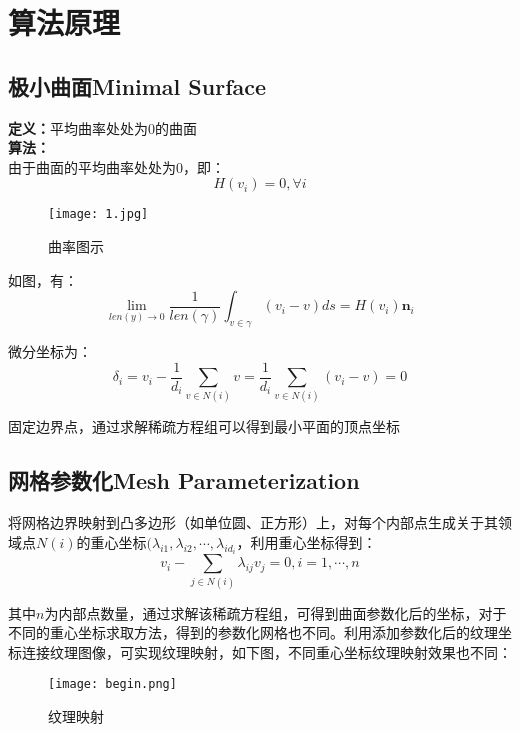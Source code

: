 \documentclass[14pt]{scrartcl} %
\begin{document}
\pagebreak
\section{算法原理}

\subsection{极小曲面Minimal Surface}

\textbf{定义：}平均曲率处处为0的曲面\\
\textbf{算法：}\\
由于曲面的平均曲率处处为0，即：
\begin{equation}
H(v_i)=0,\forall i
\end{equation}
\begin{figure}[h] %
	\centering
	\texttt{[image: 1.jpg]} %
	\caption{曲率图示}
\end{figure}

如图，有：
\begin{equation}
\lim\limits_{len(y)\rightarrow 0}\frac{1}{len(\gamma)}\int_{v\in \gamma}(v_i-v)ds=H(v_i)\boldsymbol{n}_i
\end{equation}

微分坐标为：
\begin{equation}
\delta_i=v_i-\frac{1}{d_i}\sum\limits_{v\in N(i)} v =\frac{1}{d_i}\sum\limits_{v\in N(i)} (v_i-v)=0
\end{equation}

固定边界点，通过求解稀疏方程组可以得到最小平面的顶点坐标
\pagebreak

\subsection{网格参数化Mesh Parameterization}

将网格边界映射到凸多边形（如单位圆、正方形）上，对每个内部点生成关于其领域点$N(i)$的重心坐标$(\lambda_{i1},\lambda_{i2},\cdots,\lambda_{id_i}$，利用重心坐标得到：
\begin{equation}
v_i-\sum\limits_{j\in N(i)}\lambda_{ij}v_j=0,i=1,\cdots,n
\end{equation}

其中$n$为内部点数量，通过求解该稀疏方程组，可得到曲面参数化后的坐标，对于不同的重心坐标求取方法，得到的参数化网格也不同。利用添加参数化后的纹理坐标连接纹理图像，可实现纹理映射，如下图，不同重心坐标纹理映射效果也不同：
\begin{figure}[h] %
	\centering
	\texttt{[image: begin.png]} %
	\caption{纹理映射}
\end{figure}
\end{document}

